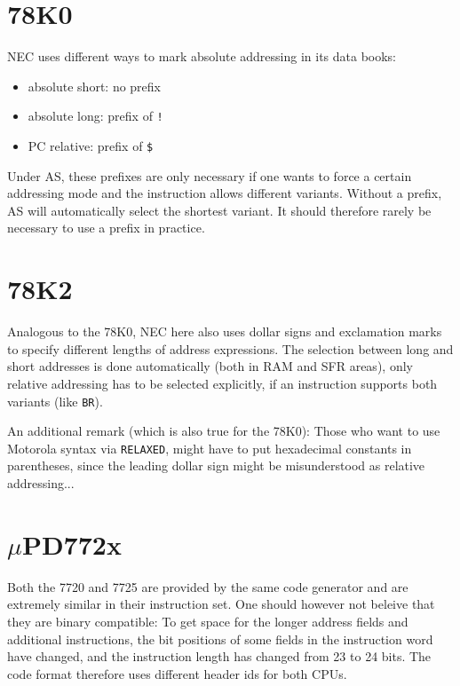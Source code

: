 \documentclass[12pt,twoside]{report}
\newcommand{\tty}[1]{{\tt #1}}
\begin{document}

\section{78K0}
\label{78K0Spec}

NEC uses different ways to mark absolute addressing in its data
books: 
\begin{itemize}
\item{absolute short: no prefix}
\item{absolute long: prefix of \tty{!}}
\item{PC relative: prefix of \tty{\$}}
\end{itemize}
Under AS, these prefixes are only necessary if one wants to force a
certain addressing mode and the instruction allows different
variants.  Without a prefix, AS will automatically select the shortest
variant.  It should therefore rarely be necessary to use a prefix in
practice.


\section{78K2}
\label{78K2Spec}

Analogous to the 78K0, NEC here also uses dollar signs and exclamation
marks to specify different lengths of address expressions.  The selection
between long and short addresses is done automatically (both in RAM and
SFR areas), only relative addressing has to be selected explicitly, if an
instruction supports both variants (like {\tt BR}).

An additional remark (which is also true for the 78K0): Those who want to
use Motorola syntax via {\tt RELAXED}, might have to put hexadecimal
constants in parentheses, since the leading dollar sign might be
misunderstood as relative addressing...


\section{$\mu$PD772x}

Both the 7720 and 7725 are provided by the same code generator and are
extremely similar in their instruction set.  One should however not
beleive that they are binary compatible: To get space for the longer
address fields and additional instructions, the bit positions of some
fields in the instruction word have changed, and the instruction length
has changed from 23 to 24 bits.  The code format therefore uses different
header ids for both CPUs.
\end{document}
